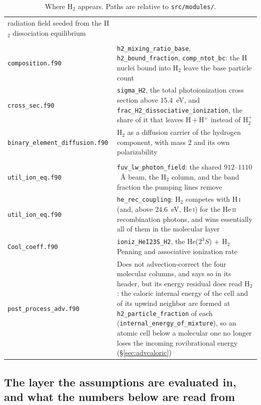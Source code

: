 \documentclass[english,a4paper]{my_memo}
\begin{document}
\begin{table}[htbp]
\begin{tabular}{@{}>{\raggedright\arraybackslash}p{}>{\raggedright\arraybackslash}p{}@{}}
    radiation field seeded from the H$_2$ dissociation equilibrium \\
\addlinespace
\multicolumn{2}{@{}l}{\textbf{\texttt{functions/}}} \\
\texttt{composition.f90}
  & \texttt{h2\_mixing\_ratio\_base}, \texttt{h2\_bound\_fraction},
    \texttt{comp\_ntot\_bc}: the H nuclei bound into H$_2$ leave the base
    particle count \\
\texttt{cross\_sec.f90}
  & \texttt{sigma\_H2}, the total photoionization cross section above
    $15.4$~eV, and
    \texttt{frac\_H2\_\allowbreak dissociative\_\allowbreak ionization}, the
    share of it that leaves H\,$+$\,H$^+$ instead of H$_2^+$ \\
\texttt{binary\_element\_\allowbreak diffusion.f90}
  & H$_2$ as a diffusion carrier of the hydrogen component, with mass $2$ and
    its own polarizability \\
\addlinespace
\multicolumn{2}{@{}l}{\textbf{\texttt{radiation/} and \texttt{post\_process/}}} \\
\texttt{util\_ion\_eq.f90}
  & \texttt{fuv\_lw\_photon\_field}: the shared $912$--$1110$~\AA{} beam, the
    H$_2$ column, and the band fraction the pumping lines remove \\
\texttt{util\_ion\_eq.f90}
  & \texttt{he\_rec\_coupling}: H$_2$ competes with H\,\textsc{i} (and, above
    $24.6$~eV, He\,\textsc{i}) for the He\,\textsc{ii} recombination photons,
    and wins essentially all of them in the molecular layer \\
\texttt{Cool\_coeff.f90}
  & \texttt{ioniz\_HeI23S\_H2}, the He($2^3S$) $+$ H$_2$ Penning and
    associative ionization rate \\
\texttt{post\_process\_adv.f90}
  & Does not advection-correct the four molecular columns, and says so in its
    header, but its energy residual does read H$_2$: the caloric internal
    energy of the cell and of its upwind neighbor are formed at
    \texttt{h2\_particle\_fraction} of each
    (\texttt{internal\_energy\_of\_mixture}), so an atomic cell below a
    molecular one no longer loses the incoming rovibrational energy
    (\S\ref{sec:advcaloric}) \\
\bottomrule
\end{tabular}
\caption{Where H$_2$ appears. Paths are relative to \texttt{src/modules/}.}
\label{tab:codemap}
\end{table}

\subsection{The layer the assumptions are evaluated in, and what the numbers
below are read from}
\label{sec:layer}
\end{document}
